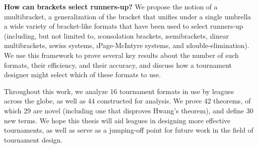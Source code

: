 {    {\bf How can brackets select runners-up?} We propose the notion of a \i{multibracket}, a generalization of the bracket that unifies under a single umbrella a wide variety of bracket-like formats that have been used to select runners-up (including, but not limited to, \i{consolation brackets}, \i{semibrackets}, \i{linear multibrackets}, \i{swiss systems}, \i{Page-McIntyre systems}, and \i{double-elimination}). We use this framework to prove several key results about the number of such formats, their efficiency, and their accuracy, and discuss how a tournament designer might select which of these formats to use.

    Throughout this work, we analyze 16 tournament formats in use by leagues across the globe, as well as 44 constructed for analysis. We prove 42 theorems, of which 29 are novel (including one that disproves Hwang's theorem), and define 30 new terms. We hope this thesis will aid leagues in designing more effective tournaments, as well as serve as a jumping-off point for future work in the field of tournament design.
}


